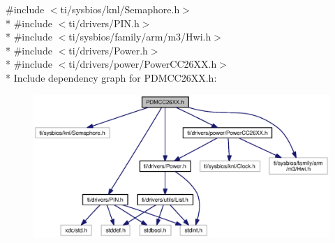 {\ttfamily \#include $<$ti/sysbios/knl/\+Semaphore.\+h$>$}\\*
{\ttfamily \#include $<$ti/drivers/\+P\+I\+N.\+h$>$}\\*
{\ttfamily \#include $<$ti/sysbios/family/arm/m3/\+Hwi.\+h$>$}\\*
{\ttfamily \#include $<$ti/drivers/\+Power.\+h$>$}\\*
{\ttfamily \#include $<$ti/drivers/power/\+Power\+C\+C26\+X\+X.\+h$>$}\\*
Include dependency graph for P\+D\+M\+C\+C26\+X\+X.\+h\+:
\nopagebreak
\begin{figure}[H]
\begin{center}
\leavevmode
\includegraphics[width=350pt]{_p_d_m_c_c26_x_x_8h__incl}
\end{center}
\end{figure}
